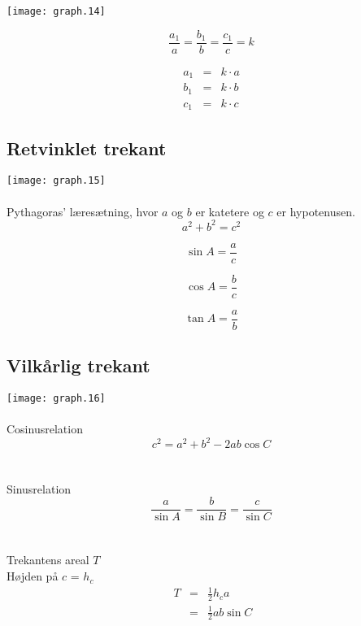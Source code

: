 \documentclass[11pt,a5paper,fleqn,leqno]{book}
\begin{document}
\texttt{[image: graph.14]}

\begin{equation}
\frac{a_1}{a} = \frac{b_1}{b} = \frac{c_1}{c} = k
\end{equation}

\begin{eqnarray}
a_1 & = & k \cdot a \\
b_1 & = & k \cdot b \nonumber \\
c_1 & = & k \cdot c \nonumber
\end{eqnarray}

\vfill

\subsection{Retvinklet trekant}

\texttt{[image: graph.15]}
\\
\\
Pythagoras' læresætning, hvor $a$ og $b$ er katetere og $c$ er hypotenusen.
\begin{equation} \label{eq:trekant_pythagoras}
a^2 + b^2 = c^2
\end{equation}

\begin{equation}
\sin A = \frac{a}{c}
\end{equation}

\begin{equation}
\cos A = \frac{b}{c}
\end{equation}

\begin{equation}
\tan A = \frac{a}{b}
\end{equation}

\vfill

\subsection{Vilkårlig trekant}

\texttt{[image: graph.16]}
\\
\\
Cosinusrelation
\begin{equation}
c^2 = a^2 + b^2 - 2ab\cos C
\end{equation}
\\
\\
Sinusrelation
\begin{equation}
\frac{a}{\sin A} = \frac{b}{\sin B} = \frac{c}{\sin C}
\end{equation}
\\
\\
Trekantens areal $T$ \\
Højden på $c$ = $h_c$
\begin{eqnarray}
\; T & = & \frac{1}{2}h_c a \\
& = & \frac{1}{2}ab\sin C \nonumber
\end{eqnarray}
\end{document}
